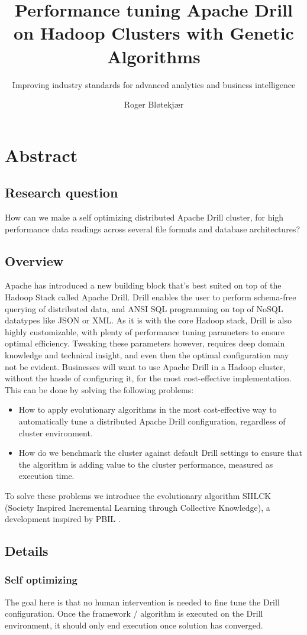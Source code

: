 \documentclass[a4paper,english]{report}
\title{Performance tuning Apache Drill on Hadoop Clusters with Genetic Algorithms}
\subtitle{Improving industry standards for advanced analytics and business intelligence}
\author{Roger Bløtekjær}
\begin{document}
	\duoforside[dept={Institutt for informatikk},
	program={Informatikk: språkteknologi},
	short]
	\section{Abstract}
		\subsection{Research question}
		How can we make a self optimizing distributed Apache Drill cluster, for high performance data readings across several file formats and database architectures?
		\subsection{Overview}
		Apache has introduced a new building block that's best suited on top of the Hadoop Stack called Apache Drill. Drill enables the user to perform schema-free querying of distributed data, and ANSI SQL programming on top of NoSQL datatypes like JSON or XML. As it is with the core Hadoop stack, Drill is also highly customizable, with plenty of performance tuning parameters to ensure optimal efficiency. Tweaking these parameters however, requires deep domain knowledge and technical insight, and even then the optimal configuration may not be evident. Businesses will want to use Apache Drill in a Hadoop cluster, without the hassle of configuring it, for the most cost-effective implementation. This can be done by solving the following problems:
		\begin{itemize}
			\item How to apply evolutionary algorithms in the most cost-effective way to automatically tune a distributed Apache Drill configuration, regardless of cluster environment.
			\item How do we benchmark the cluster against default Drill settings to ensure that the algorithm is adding value to the cluster performance, measured as execution time.
		\end{itemize}
		To solve these problems we introduce the evolutionary algorithm SIILCK (Society Inspired Incremental Learning through Collective Knowledge), a development inspired by PBIL \cite{pbil}.
		\subsection{Details}
			\subsubsection{Self optimizing}
			The goal here is that no human intervention is needed to fine tune the Drill configuration. Once the framework / algorithm is executed on the Drill environment, it should only end execution once solution has converged.
\end{document}
